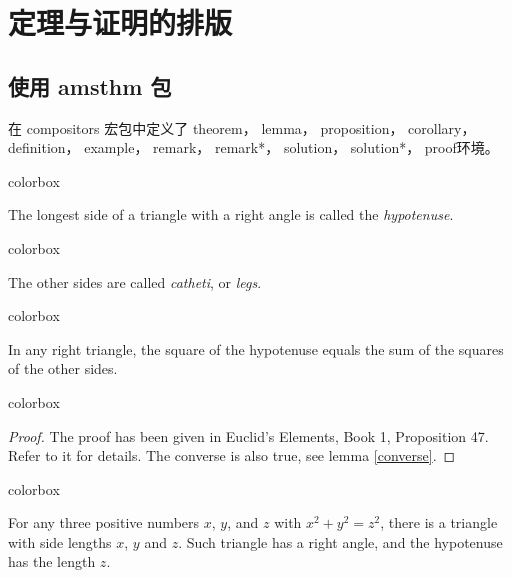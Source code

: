 \chapter{定理与证明的排版}



\section{使用 {\AmS} amsthm 包}

在 compositors 宏包中定义了 {\ttfamily theorem，
lemma，
proposition，
corollary，
definition，
example，
remark，
remark*，
solution，
solution*，
proof}环境。

\begin{latexcode}{colorbox}
\begin{definition}[Hypotenuse]
  The longest side of a triangle with a right angle is called the \emph{hypotenuse}.
\end{definition}
\end{latexcode}

\begin{latexcode}{colorbox}
\begin{remark}
  The other sides are called \emph{catheti}, or \emph{legs}.
\end{remark}
\end{latexcode}

\begin{latexcode}{colorbox}
\begin{theorem}[Pythagoras]
  \label{pythagoras}
  In any right triangle, the square of the hypotenuse equals the sum of the squares of the other sides.
\end{theorem}
\end{latexcode}

\begin{latexcode}{colorbox}
\begin{proof}
  The proof has been given in Euclid's Elements,
  Book 1, Proposition 47. Refer to it for details.
  The converse is also true, see lemma \ref{converse}. 
\end{proof}
\end{latexcode}

\begin{latexcode}{colorbox}
\begin{lemma}
  \label{converse}
  For any three positive numbers \(x\), \(y\),
  and \(z\) with \(x^2 + y^2 = z^2\), there is a triangle with side lengths \(x\), \(y\) and \(z\). Such triangle has a right angle, and the hypotenuse has the length \(z\).
\end{lemma}
\end{latexcode}

